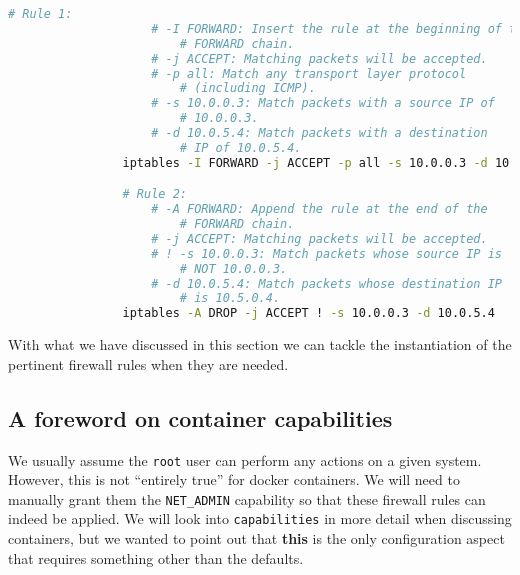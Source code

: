             \begin{lstlisting}[language = bash, caption = Instantiating \texttt{iptables} rules., label = lst:iptables-rules]
                # Rule 1:
                    # -I FORWARD: Insert the rule at the beginning of the
                        # FORWARD chain.
                    # -j ACCEPT: Matching packets will be accepted.
                    # -p all: Match any transport layer protocol
                        # (including ICMP).
                    # -s 10.0.0.3: Match packets with a source IP of
                        # 10.0.0.3.
                    # -d 10.0.5.4: Match packets with a destination
                        # IP of 10.0.5.4.
                iptables -I FORWARD -j ACCEPT -p all -s 10.0.0.3 -d 10.0.5.4

                # Rule 2:
                    # -A FORWARD: Append the rule at the end of the
                        # FORWARD chain.
                    # -j ACCEPT: Matching packets will be accepted.
                    # ! -s 10.0.0.3: Match packets whose source IP is
                        # NOT 10.0.0.3.
                    # -d 10.0.5.4: Match packets whose destination IP
                        # is 10.5.0.4.
                iptables -A DROP -j ACCEPT ! -s 10.0.0.3 -d 10.0.5.4
            \end{lstlisting}

            With what we have discussed in this section we can tackle the instantiation of the pertinent firewall rules when they are needed.\\

        \subsection{A foreword on container capabilities}
            We usually assume the \texttt{root} user can perform any actions on a given system. However, this is not ``entirely true'' for docker containers. We will need to manually grant them the \texttt{NET\_ADMIN} capability so that these firewall rules can indeed be applied. We will look into \texttt{capabilities} in more detail when discussing containers, but we wanted to point out that \textbf{this} is the only configuration aspect that requires something other than the defaults.\\

